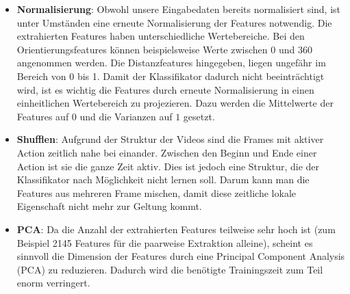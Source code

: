 \begin{itemize}

  \item \textbf{Normalisierung}: Obwohl unsere Eingabedaten bereits normalisiert sind, ist unter Umständen eine erneute Normalisierung der Features notwendig. Die extrahierten
        Features haben unterschiedliche Wertebereiche. Bei den Orientierungsfeatures können beispielsweise Werte zwischen 0 und 360 angenommen werden. Die Distanzfeatures hingegeben, liegen
        ungefähr im Bereich von 0 bis 1. Damit der Klassifikator dadurch nicht beeinträchtigt wird, ist es wichtig die Features durch erneute Normalisierung in einen einheitlichen
        Wertebereich zu projezieren. Dazu werden die Mittelwerte der Features auf $0$ und die Varianzen auf $1$ gesetzt.

  \item \textbf{Shufflen}: 
    Aufgrund der Struktur der Videos sind die Frames mit aktiver Action zeitlich nahe bei einander. Zwischen den Beginn und Ende einer Action ist sie die ganze Zeit aktiv.
    Dies ist jedoch eine Struktur, die der Klassifikator nach Möglichkeit nicht lernen soll. Darum kann man die Features aus mehreren Frame mischen, damit diese zeitliche lokale Eigenschaft nicht mehr zur Geltung kommt.

  \item \textbf{PCA}: Da die Anzahl der extrahierten Features teilweise sehr hoch ist (zum Beispiel 2145 Features für die paarweise Extraktion alleine), scheint es  sinnvoll die Dimension der Features durch eine Principal Component Analysis (PCA) zu reduzieren. Dadurch wird die benötigte Trainingszeit zum Teil enorm verringert. 
\end{itemize}

